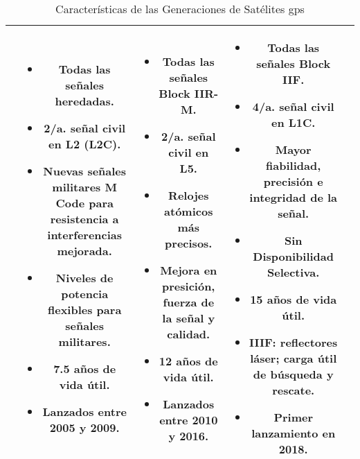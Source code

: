 \begin{table}[H]
\begin{tabular}{|c|c|c|c|c|}
{{            }
        } &
        \parbox[t]{2.5cm}{
            {\fontsize{9}{11}\selectfont
                \begin{itemize}[leftmargin=*]
                    \item Todas las señales heredadas.
                    \item 2/a. señal civil en L2 (L2C).
                    \item Nuevas señales militares M Code para resistencia a interferencias mejorada.
                    \item Niveles de potencia flexibles para señales militares.
                    \item 7.5 años de vida útil.
                    \item Lanzados entre 2005 y 2009.
                \end{itemize}
            }
        } &
        \parbox[t]{2.5cm}{
            {\fontsize{9}{11}\selectfont
                \begin{itemize}[leftmargin=*]
                    \item Todas las señales Block IIR-M.
                    \item 2/a. señal civil en L5.
                    \item Relojes atómicos más precisos.
                    \item Mejora en presición, fuerza de la señal y calidad.
                    \item 12 años de vida útil.
                    \item Lanzados entre 2010 y 2016.
                \end{itemize}
            }
        } &
        \parbox[t]{2.5cm}{
            {\fontsize{9}{11}\selectfont
                \begin{itemize}[leftmargin=*]
                    \item Todas las señales Block IIF.
                    \item 4/a. señal civil en L1C.
                    \item Mayor fiabilidad, precisión e integridad de la señal.
                    \item Sin Disponibilidad Selectiva.
                    \item 15 años de vida útil.
                    \item IIIF: reflectores láser; carga útil de búsqueda y rescate.
                    \item Primer lanzamiento en 2018.
                \end{itemize}
                \vspace{5pt}
            }
        } \\
        \hline
    \end{tabular}
    \caption{Características de las Generaciones de Satélites \gls{gps}}
    \label{tab:gps_satellites}
\end{table}

